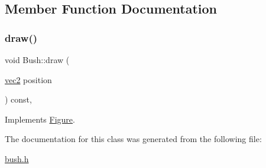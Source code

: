 \subsection{Member Function Documentation}
\mbox{\label{classBush_aa73b14744dbe2b868142dc2deae485ba}} 
\subsubsection{\texorpdfstring{draw()}{draw()}}
{\footnotesize\ttfamily void Bush\+::draw (\begin{DoxyParamCaption}\item[{\hyperlink{structvec2}{vec2}}]{position }\end{DoxyParamCaption}) const\hspace{0.3cm}{\ttfamily [inline]}, {\ttfamily [virtual]}}



Implements \hyperlink{classFigure_ac16583e764bdc244076957bf775e4866}{Figure}.



The documentation for this class was generated from the following file\+:\begin{DoxyCompactItemize}
\item 
\hyperlink{bush_8h}{bush.\+h}\end{DoxyCompactItemize}
